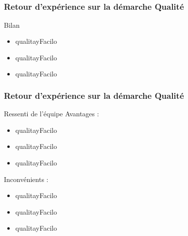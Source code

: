 \speaker{\Kafui}
\subsection{} %

\begin{frame}

\frametitle{Retour d'expérience sur la démarche Qualité}
	\begin{block}{Bilan}
		\begin{itemize}
			\item qualitayFacilo		
			\item qualitayFacilo
			\item qualitayFacilo
		\end{itemize}      
	\end{block}
\end{frame}

\begin{frame}

\frametitle{Retour d'expérience sur la démarche Qualité}
	\begin{block}{Ressenti de l'équipe}
		Avantages : 
		\begin{itemize}
			\item qualitayFacilo	
			\item qualitayFacilo
			\item qualitayFacilo
		\end{itemize}   
		Inconvénients :
		\begin{itemize}
			\item qualitayFacilo	
			\item qualitayFacilo
			\item qualitayFacilo			
		\end{itemize}   
	\end{block}
\end{frame}
